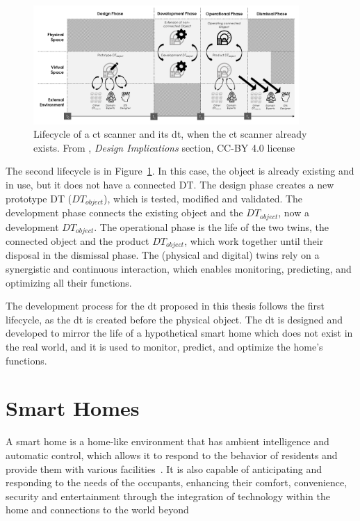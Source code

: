 \begin{figure}
    \centering
    \includegraphics[width=0.9\textwidth]{images/digital_twins/dt_lifecycle_2.png}
    \caption[Lifecycle of a \acrshort{ct} scanner and its \acrshort{dt}, when the \acrshort{ct} scanner already exists]{Lifecycle of a \acrshort{ct} scanner and its \acrshort{dt}, when the \acrshort{ct} scanner already exists. From \textcite{barricelliSurveyDigitalTwin2019}, \textit{Design Implications} section, CC-BY 4.0 license}
    \label{fig:dt_lifecycle_2}
\end{figure}

The second lifecycle is in Figure~\ref{fig:dt_lifecycle_2}. In this case, the object is already existing and in use, but it does not have a connected DT. The design phase creates a new prototype DT ($DT_{object}$), which is tested, modified and validated. The development phase connects the existing object and the $DT_{object}$, now a development $DT_{object}$. The operational phase is the life of the two twins, the connected object and the product $DT_{object}$, which work together until their disposal in the dismissal phase. The (physical and digital) twins rely on a synergistic and continuous interaction, which enables monitoring, predicting, and optimizing all their functions.

The development process for the \acrshort{dt} proposed in this thesis follows the first lifecycle, as the \acrshort{dt} is created before the physical object. The \acrshort{dt} is designed and developed to mirror the life of a hypothetical smart home which does not exist in the real world, and it is used to monitor, predict, and optimize the home's functions.

\section{Smart Homes}

A smart home is a home-like environment that has ambient intelligence and automatic control, which allows it to respond to the behavior of residents and provide them with various facilities~\parencite{desilvaStateArtSmart2012}. It is also capable of anticipating and responding to the needs of the occupants, enhancing their comfort, convenience, security and entertainment through the integration of technology within the home and connections to the world beyond~\parencite{aldrichSmartHomesPresent2003}

